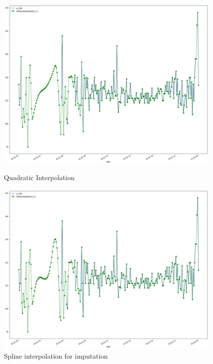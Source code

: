 %


\begin{figure}[h]
\centering
\begin{minipage}{.49\linewidth}
    \includegraphics[width=.9\textwidth]{img/quadratic.png}    
    \caption{Quadratic Interpolation}
    \label{img1}
\end{minipage}
\hfill
\begin{minipage}{.49\linewidth}
    \includegraphics[width=.9\textwidth]{img/spline.png} 
    \caption{Spline interpolation for imputation}
    \label{img2}
\end{minipage}
\end{figure}



